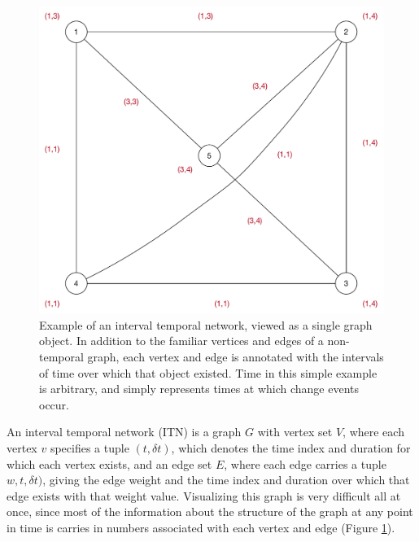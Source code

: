     \begin{figure}[ht]
    \centering
    \includegraphics[scale=0.50]{graphics/multipleseriation/interval-temporal-network-single-view.pdf}
    \caption{Example of an interval temporal network, viewed as a single graph object.  In addition to the familiar vertices and edges of a non-temporal graph, each vertex and edge is annotated with the intervals of time over which that object existed.  Time in this simple example is arbitrary, and simply represents times at which change events occur.}
    \label{metapop:fig:itn-single-example}
    \end{figure}
    
    An interval temporal network (ITN) is a graph \(G\) with vertex set \(V\), where each vertex \(v\) specifies a tuple \((t, \delta t)\), which denotes the time index and duration for which each vertex exists, and an edge set \(E\), where each edge carries a tuple \(w, t, \delta t)\), giving the edge weight and the time index and duration over which that edge exists with that weight value.  Visualizing this graph is very difficult all at once, since most of the information about the structure of the graph at any point in time is carries in numbers associated with each vertex and edge (Figure \ref{metapop:fig:itn-single-example}).  
    
